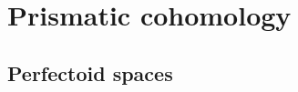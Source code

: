         \chapter{Prismatic cohomology}
            \begin{abstract}
                
            \end{abstract}
            
            \minitoc
            
            
            
            
            
            
            
        \begin{appendices}
            \chapter{Perfectoid spaces}
                \begin{abstract}
                    
                \end{abstract}
                
                \minitoc
                
                
                
                
        \end{appendices}
	
	\printbibliography


